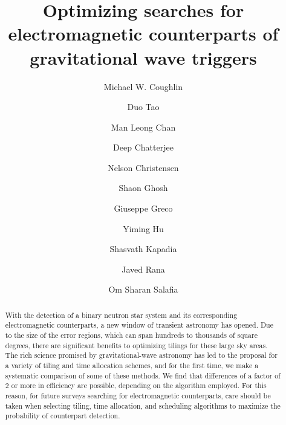 \documentclass[twocolumn]{aastex61}
\begin{document}
\title{Optimizing searches for electromagnetic counterparts of gravitational wave triggers}

\author{Michael W. Coughlin}

\author{Duo Tao}

\author{Man Leong Chan}

\author{Deep Chatterjee}

\author{Nelson Christensen}

\author{Shaon Ghosh}

\author{Giuseppe Greco}

\author{Yiming Hu}

\author{Shasvath Kapadia}

\author{Javed Rana}

\author{Om Sharan Salafia}

\begin{abstract}
With the detection of a binary neutron star system and its corresponding electromagnetic counterparts, a new window of transient astronomy has opened. 
Due to the size of the error regions, which can span hundreds to thousands of square degrees, there are significant benefits to optimizing tilings for these large sky areas.
The rich science promised by gravitational-wave astronomy has led to the proposal for a variety of tiling and time allocation schemes, and for the first time, we make a systematic comparison of some of these methods.
We find that differences of a factor of 2 or more in efficiency are possible, depending on the algorithm employed.
For this reason, for future surveys searching for electromagnetic counterparts, care should be taken when selecting tiling, time allocation, and scheduling algorithms to maximize the probability of counterpart detection.

\end{abstract}
\end{document}
